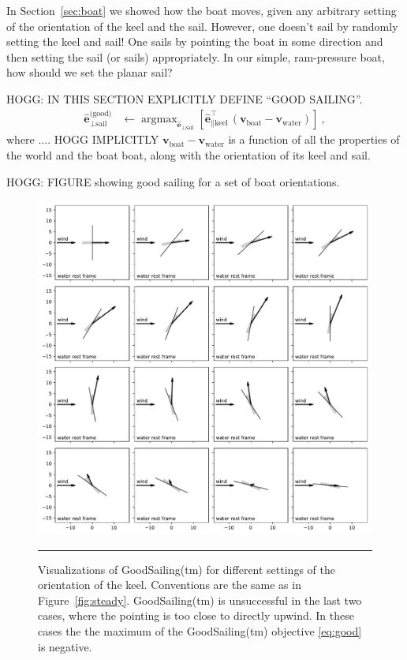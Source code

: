 \documentclass[letterpaper]{article}
\DeclareMathOperator*{\argmax}{argmax}
\renewcommand{\vec}[1]{\boldsymbol{#1}}
\newcommand{\uvec}{\vec{\hat{e}}}
\newcommand{\water}{\text{water}}
\newcommand{\boat}{\text{boat}}
\newcommand{\good}{\text{(good)}}
\newcommand{\sail}{\text{sail}}
\newcommand{\keel}{\text{keel}}
\newcommand{\vwater}{\vec{v}_\water}
\newcommand{\vboat}{\vec{v}_\boat}
\newcommand{\secref}[1]{Section~\ref{#1}}
\newcommand{\figref}[1]{Figure~\ref{#1}}
\newcommand{\figurerule}{\rule[1ex]{\textwidth}{0.2pt}}
\begin{document}
In \secref{sec:boat} we showed how the boat moves, given any arbitrary setting of the orientation of the keel and the sail.
However, one doesn't sail by randomly setting the keel and sail!
One sails by pointing the boat in some direction and then setting the sail (or sails) appropriately.
In our simple, ram-pressure boat, how should we set the planar sail?

HOGG: IN THIS SECTION EXPLICITLY DEFINE ``GOOD SAILING''.
\begin{align}\label{eq:good}
    \uvec_{\perp\sail}^\good &\leftarrow \argmax_{\uvec_{\perp\sail}} \left[\uvec_{\parallel\keel}^\top\,(\vboat-\vwater)\right] ~,
\end{align}
where .... HOGG IMPLICITLY $\vboat-\vwater$ is a function of all the properties of the world and the boat boat, along with the orientation of its keel and sail.

HOGG: FIGURE showing good sailing for a set of boat orientations.
\begin{figure}[t!]
  \includegraphics[width=\textwidth]{good.pdf}
  \caption{Visualizations of GoodSailing(tm) for different settings of the orientation of the keel.
  Conventions are the same as in \figref{fig:steady}.
  GoodSailing(tm) is unsuccessful in the last two cases, where the pointing is too close to directly upwind.
  In these cases the the maximum of the GoodSailing(tm) objective \eqref{eq:good} is negative.\label{fig:good}}
  \figurerule
\end{figure}
\end{document}
